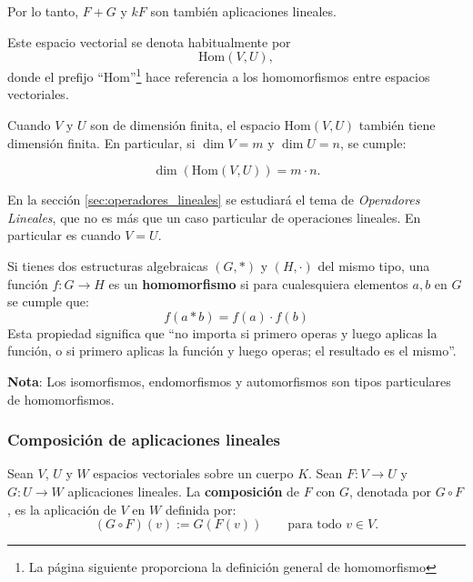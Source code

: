 Por lo tanto, \(F + G\) y \(kF\) son también aplicaciones lineales.


Este espacio vectorial se denota habitualmente por
\[
  \text{Hom}(V, U),
\]
donde el prefijo ``Hom''\footnote{La página siguiente proporciona la definición general de homomorfismo} hace referencia a los homomorfismos entre espacios vectoriales.

Cuando \(V\) y \(U\) son de dimensión finita, el espacio \(\text{Hom}(V,U)\) también tiene dimensión finita. En particular, si \(\dim V = m\) y \(\dim U = n\), se cumple:

\begin{equation}
  \dim(\text{Hom}(V, U)) = m \cdot n.
  \label{eq:dim_homomorfismo}
\end{equation}

En la sección \ref{sec:operadores_lineales} se estudiará el tema de \textit{Operadores Lineales}, que no es más que un caso particular de operaciones lineales. En particular es cuando \(V=U\).

\begin{tcolorbox}[remember, title=Homomorfismo]
  Si tienes dos estructuras algebraicas \((G,\ast)\) y \((H,\cdot)\) del mismo tipo, una función \(f:G\rightarrow H\) es un \textbf{homomorfismo} si para cualesquiera elementos \(a,b\) en \(G\) se cumple que:
  \[
    f(a\ast b) = f(a) \cdot f(b)
  \]
  Esta propiedad significa que ``no importa si primero operas y luego aplicas la función, o si primero aplicas la función y luego operas; el resultado es el mismo''.

  \textbf{Nota}: Los isomorfismos, endomorfismos y automorfismos son tipos particulares de homomorfismos.
\end{tcolorbox}

\subsubsection{Composición de aplicaciones lineales}

Sean \(V\), \(U\) y \(W\) espacios vectoriales sobre un cuerpo \(K\). Sean \(F : V \rightarrow U\) y \(G : U \rightarrow W\) aplicaciones lineales. La \textbf{composición} de \(F\) con \(G\), denotada por \(G \circ F\), es la aplicación de \(V\) en \(W\) definida por:
\[
  (G \circ F)(v) := G(F(v)) \qquad \text{para todo } v \in V.
\]

